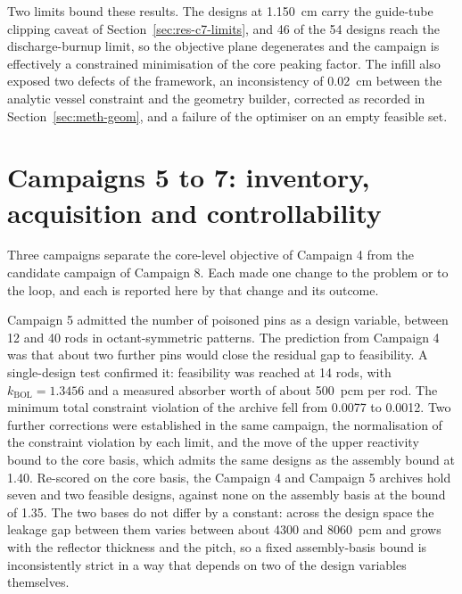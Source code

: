 Two limits bound these results. The designs at \SI{1.150}{cm} carry the
guide-tube clipping caveat of Section~\ref{sec:res-c7-limits}, and 46
of the 54 designs reach the discharge-burnup limit, so the objective plane
degenerates and the campaign is effectively a constrained minimisation
of the core peaking factor. The infill also exposed two defects of the
framework, an inconsistency of \SI{0.02}{cm} between the analytic
vessel constraint and the geometry builder, corrected as recorded in
Section~\ref{sec:meth-geom}, and a failure of the optimiser on an empty
feasible set.

\section{Campaigns 5 to 7: inventory, acquisition and controllability}
\label{sec:res-c5-c7}
\label{sec:res-campaign5}\label{eq:pins-needed}\label{tab:c5}\label{fig:c5pins}\label{sec:res-c5-search}\label{eq:violation-normalised}\label{fig:c5traj}\label{fig:c5lobes}\label{sec:res-c5-corrected}\label{fig:c5objcorr}\label{tab:c5-champions}\label{eq:kmin-selfcons}\label{sec:res-c5-kbasis}\label{fig:c5kbasis}\label{tab:c5-sweep}\label{sec:c5_confirmation}\label{tab:c5_confirmation}\label{fig:restart_defect}\label{tab:restart_experiment}


Three campaigns separate the core-level objective of Campaign 4 from the
candidate campaign of Campaign 8. Each made one change to the problem or to
the loop, and each is reported here by that change and its outcome.

Campaign 5 admitted the number of poisoned pins as a design variable,
between 12 and 40 rods in octant-symmetric patterns. The prediction from
Campaign 4 was that about two further pins would close the residual gap to
feasibility. A single-design test confirmed it: feasibility was reached at
14 rods, with $k_\mathrm{BOL} = 1.3456$ and a measured absorber worth of
about \SI{500}{pcm} per rod. The minimum total constraint violation of the
archive fell from 0.0077 to 0.0012. Two further corrections were established
in the same campaign, the normalisation of the constraint violation by each
limit, and the move of the upper reactivity bound to the core basis, which admits
the same designs as the assembly bound at 1.40. Re-scored on the core
basis, the Campaign 4 and Campaign 5 archives hold seven and two
feasible designs, against none on the assembly basis at the bound of
1.35. The two bases do not differ by a constant: across the design space the leakage gap between
them varies between about \num{4300} and \SI{8060}{pcm} and grows with
the reflector thickness and the pitch, so a fixed assembly-basis bound
is inconsistently strict in a way that depends on two of the design
variables themselves.

